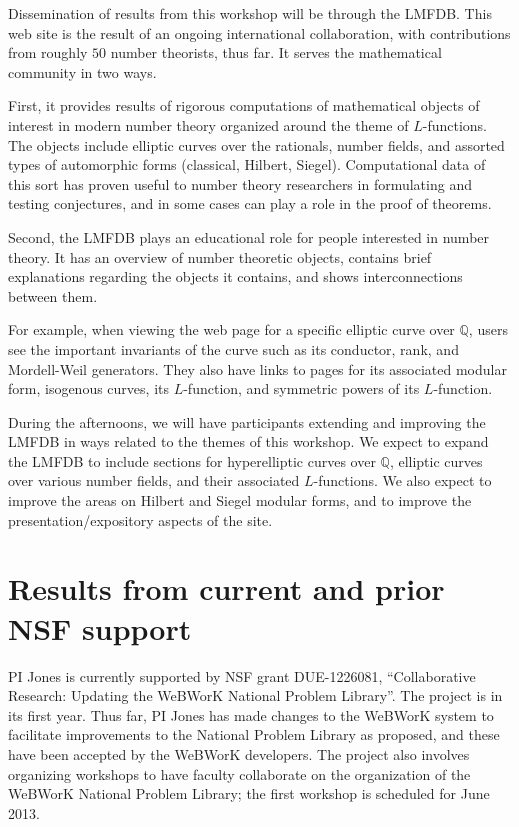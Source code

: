 \documentclass[12pt]{amsart}
\numberwithin{equation}{section}
\newcommand{\Q}{\mathbb Q}
\begin{document}
Dissemination of results from this workshop will be through the
\textsf{LMFDB}.  This web site is the result of an ongoing international
collaboration, with contributions from roughly $50$ number theorists,
thus far.  It serves the mathematical community in two ways.

First, it provides results of rigorous computations of mathematical
objects of interest in modern number theory organized around the theme
of $L$-functions.  The objects include elliptic curves over the
rationals, number fields, and assorted types of automorphic forms
(classical, Hilbert, Siegel).  Computational data of this sort has
proven useful to number theory researchers in formulating and testing
conjectures, and in some cases can play a role in the proof of
theorems.

Second, the \textsf{LMFDB} plays an educational role for people interested in
number theory.  It has an overview of number theoretic objects,
contains brief explanations regarding the objects it contains, and
shows interconnections between them.  

For example, when viewing the web page for a specific elliptic curve
over $\Q$, users see the important invariants of the curve such as its
conductor, rank, and Mordell-Weil generators.  They also have links to
pages for its associated modular form, isogenous curves, its
$L$-function, and symmetric powers of its $L$-function.

During the afternoons, we will have participants extending and improving
the \textsf{LMFDB} in ways related to the themes of this workshop.  We expect
to expand the \textsf{LMFDB} to include sections for hyperelliptic curves over
$\Q$, elliptic curves over various number fields, and their
associated $L$-functions.  We also expect to improve the areas on
Hilbert and Siegel modular forms, and to improve the
presentation/expository aspects of the site.


\section{Results from current and prior NSF support}
PI Jones is currently supported by NSF grant DUE-1226081,
``Collaborative Research: Updating the WeBWorK National Problem
Library''.  The project is in its first year.  Thus far, PI Jones has
made changes to the WeBWorK system to facilitate improvements to the
National Problem Library as proposed, and these have been accepted by
the WeBWorK developers.  The project also involves organizing
workshops to have faculty collaborate on the organization of the
WeBWorK National Problem Library; the first workshop is scheduled for
June 2013.


\end{document}
